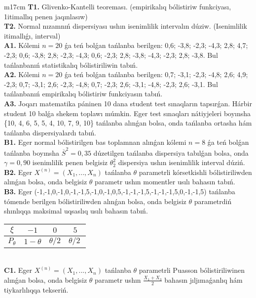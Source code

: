 \documentclass{article}
\begin{document}
\begin{tabular}{m{17cm}}
\textbf{T1.} 
Glivenko-Kantelli teoreması. (empirikalıq bólistiriw funkciyası, 1itimallıq penen jaqınlasıw)
 \\
\textbf{T2.} 
Normal nızamnıń dispersiyası ushın isenimlilik intervalın dúziw. (Isenimlilik itimallıǵı, interval)
 \\
\textbf{A1.} 
Kólemi \(n = 20\) ǵa teń bolǵan tańlanba berilgen: 0,6; -3,8; -2,3; -4,3; 2,8; 4,7; -2,3; 0,6; -3,8; 2,8; -2,3; -4,3; 0,6; -2,3; 2,8; -3,8; -4,3; -2,3; 2,8; -3,8. Bul tańlanbanıń statistikalıq bólistiriliwin tabıń.
 \\
\textbf{A2.} 
Kólemi \(n = 20\) ǵa teń bolǵan tańlanba berilgen: 0,7; -3,1; -2,3; -4,8; 2,6; 4,9; -2,3; 0,7; -3,1; 2,6; -2,3; -4,8; 0,7; -2,3; 2,6; -3,1; -4,8; -2,3; 2,6; -3,1. Bul tańlanbanıń empirikalıq bólistiriw funkciyasın tabıń.
 \\
\textbf{A3.} 
Joqarı matematika páninen 10 dana student test sınaqların tapsırǵan. Hárbir student 10 balǵa shekem toplawı múmkin. Eger test sınaqları nátiyjeleri boyınsha \{10, 4, 6, 5, 5, 4, 10, 7, 9, 10\} tańlanba alınǵan bolsa, onda tańlanba ortasha hám tańlanba dispersiyalardı tabıń.
 \\
\textbf{B1.} 
Eger normal bólistirilgen bas toplamnan alınǵan kólemi \(n = 8\) ǵa teń bolǵan tańlanba boyınsha \({\overline{S}}^{2} = 0,35\) dúzetilgen tańlanba dispersiya tabılǵan bolsa, onda \(\gamma = 0,90\) isenimlilik penen belgisiz \(\theta_{2}^{2}\) dispersiya ushın isenimlilik interval dúziń.
 \\
\textbf{B2.} 
Eger \(X^{(n)} = \left( X_{1},...,X_{n} \right)\) tańlanba \(\theta\) parametrli kórsetkishli bólistiriliwden alınǵan bolsa, onda belgisiz \(\theta\) parametr ushın momentler usılı bahasın tabıń.
 \\
\textbf{B3.} 
Eger (-1,-1,0,-1,0,-1,-1,5,-1,0,-1,0,5,-1,-1,-1,5,-1,-1,-1,5,0,-1,-1,5) tańlanba tómende berilgen bólistiriliwden alınǵan bolsa, onda belgisiz \(\theta\) parametrdiń shınlıqqa maksimal uqsaslıq usılı bahasın tabıń.
\begin{tabular}{|c|c|c|c|}
  \hline
$\xi$
&
$- 1$
&
$0$
&
$5$\\
\hline
\(P_{\theta}\) & \(1 - \theta\) & \(\theta/2\) & \(\theta/2\ \) \\
\hline
\end{tabular}
 \\
\textbf{C1.} 
Eger \(X^{(n)} = \left( X_{1},...,X_{n} \right)\) tańlanba \(\theta\) parametrli Puasson bólistiriliwinen alınǵan bolsa, onda belgisiz \(\theta\) parametr ushın \(\frac{X_{1} + X_{3}}{2}\) bahasın jıljımaǵanlıq hám tiykarlılıqqa tekseriń.

\end{tabular}
\end{document}
